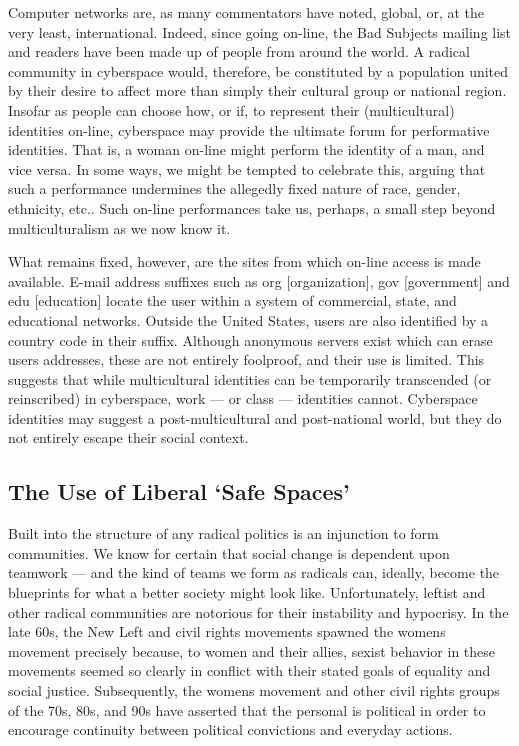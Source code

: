 \documentclass[letterpaper,12pt,english]{sphinxmanual}
\begin{document}
Computer networks are, as many commentators have noted, global, or, at the very least, international. Indeed, since going on-line, the Bad Subjects mailing list and readers have been made up of people from around the world. A radical community in cyberspace would, therefore, be constituted by a population united by their desire to affect more than simply their cultural group or national region. Insofar as people can choose how, or if, to represent their (multicultural) identities on-line, cyberspace may provide the ultimate forum for performative identities. That is, a woman on-line might perform the identity of a man, and vice versa. In some ways, we might be tempted to celebrate this, arguing that such a performance undermines the allegedly fixed nature of race, gender, ethnicity, etc.. Such on-line performances take us, perhaps, a small step beyond multiculturalism as we now know it.

What remains fixed, however, are the sites from which on-line access is made available. E-mail address suffixes such as org {[}organization{]}, gov {[}government{]} and edu {[}education{]} locate the user within a system of commercial, state, and educational networks. Outside the United States, users are also identified by a country code in their suffix. Although anonymous servers exist which can erase users addresses, these are not entirely foolproof, and their use is limited. This suggests that while multicultural identities can be temporarily transcended (or reinscribed) in cyberspace, work — or class — identities cannot. Cyberspace identities may suggest a post-multicultural and post-national world, but they do not entirely escape their social context.


\subsection{The Use of Liberal `Safe Spaces'}
\label{1995:the-use-of-liberal-safe-spaces}
Built into the structure of any radical politics is an injunction to form communities. We know for certain that social change is dependent upon teamwork — and the kind of teams we form as radicals can, ideally, become the blueprints for what a better society might look like. Unfortunately, leftist and other radical communities are notorious for their instability and hypocrisy. In the late 60s, the New Left and civil rights movements spawned the womens movement precisely because, to women and their allies, sexist behavior in these movements seemed so clearly in conflict with their stated goals of equality and social justice. Subsequently, the womens movement and other civil rights groups of the 70s, 80s, and 90s have asserted that the personal is political in order to encourage continuity between political convictions and everyday actions.
\end{document}
